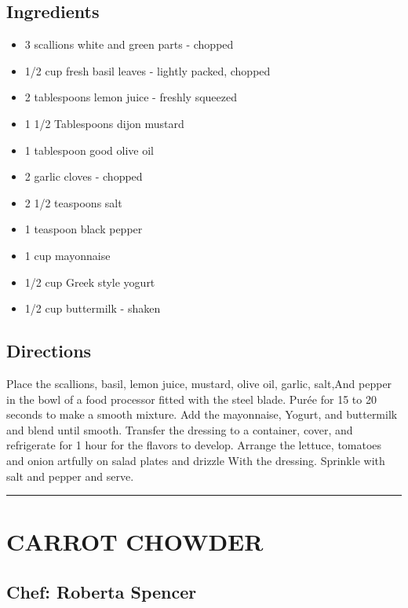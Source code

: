 \documentclass[
]{book}
\providecommand{\tightlist}{%
  \setlength{\itemsep}{0pt}\setlength{\parskip}{0pt}}
\begin{document}
\hypertarget{ingredients-16}{%
\subsection*{Ingredients}\label{ingredients-16}}


\begin{itemize}
\tightlist
\item
  3 scallions white and green parts - chopped
\item
  1/2 cup fresh basil leaves - lightly packed, chopped
\item
  2 tablespoons lemon juice - freshly squeezed
\item
  1 1/2 Tablespoons dijon mustard
\item
  1 tablespoon good olive oil
\item
  2 garlic cloves - chopped
\item
  2 1/2 teaspoons salt
\item
  1 teaspoon black pepper
\item
  1 cup mayonnaise
\item
  1/2 cup Greek style yogurt
\item
  1/2 cup buttermilk - shaken
\end{itemize}

\hypertarget{directions-16}{%
\subsection*{Directions}\label{directions-16}}


Place the scallions, basil, lemon juice, mustard, olive oil, garlic, salt,And pepper in the bowl of a food processor fitted with the steel blade. Purée for 15 to 20 seconds to make a smooth mixture. Add the mayonnaise, Yogurt, and buttermilk and blend until smooth. Transfer the dressing to a container, cover, and refrigerate for 1 hour for the flavors to develop. Arrange the lettuce, tomatoes and onion artfully on salad plates and drizzle With the dressing. Sprinkle with salt and pepper and serve.

\begin{center}\rule{0.5\linewidth}{0.5pt}\end{center}

\hypertarget{carrot-chowder}{%
\section*{CARROT CHOWDER}\label{carrot-chowder}}


\hypertarget{chef-roberta-spencer-2}{%
\subsection*{Chef: Roberta Spencer}\label{chef-roberta-spencer-2}}
\end{document}
